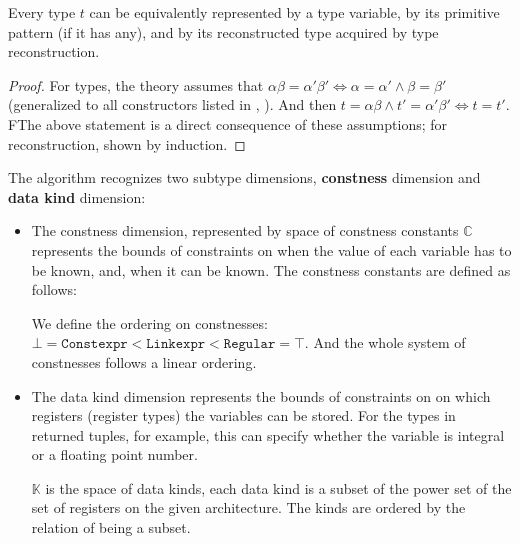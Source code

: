 \begin{lemma}
    \label{typesObs}
    Every type $t$ can be equivalently represented by a type variable, by its primitive pattern (if it has any), and by its reconstructed type acquired by type reconstruction.
\end{lemma}

\begin{proof}
    For types, the theory assumes that  $\alpha \beta = \alpha' \beta' \Leftrightarrow \alpha = \alpha' \land \beta = \beta'$  (generalized to all constructors listed in , ). And then $t = \alpha \beta \land t' = \alpha' \beta' \Leftrightarrow t = t'$. FThe above statement is a direct consequence of these assumptions; for reconstruction, shown by induction.
\end{proof}

\begin{defn}
    The algorithm recognizes two subtype dimensions, \textbf{constness} dimension and \textbf{data kind} dimension:

    \begin{itemize}
        \item  The constness dimension, represented by space of constness constants $\mathbb{C}$ represents the bounds of constraints on when the value of each variable has to be known, and, when it can be known. The constness constants are defined as follows:

\begin{center}\begin{grammar}
\end{grammar}\end{center}

        We define the ordering on constnesses: $\bot = \mathtt{Constexpr} < \mathtt{Linkexpr} < \mathtt{Regular} = \top$. And the whole system of constnesses follows a linear ordering.

        \item The data kind dimension represents the bounds of constraints on on which registers (register types) the variables can be stored. For the types in returned tuples, for example, this can specify whether the variable is integral or a floating point number.

        $\mathbb{K}$ is the space of data kinds, each data kind is a subset of the power set of the set of registers on the given architecture. The kinds are ordered by the relation of being a subset.
    \end{itemize}
\end{defn}

